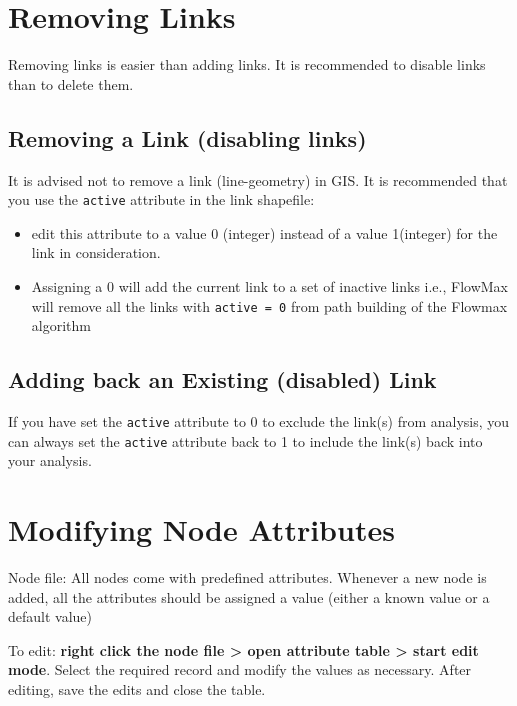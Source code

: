 \documentclass[
]{book}
\begin{document}
\chapter{Removing Links}\label{removing-links}

Removing links is easier than adding links. It is recommended to disable links than to delete them.

\section{Removing a Link (disabling links)}\label{removing-a-link-disabling-links}

It is advised not to remove a link (line-geometry) in GIS. It is recommended that you use the \texttt{active} attribute in the link shapefile:

\begin{itemize}
\item
  edit this attribute to a value 0 (integer) instead of a value 1(integer) for the link in consideration.
\item
  Assigning a 0 will add the current link to a set of inactive links i.e., FlowMax will remove all the links with \texttt{active\ =\ 0} from path building of the Flowmax algorithm
\end{itemize}

\section{Adding back an Existing (disabled) Link}\label{adding-back-an-existing-disabled-link}

If you have set the \texttt{active} attribute to 0 to exclude the link(s) from analysis, you can always set the \texttt{active} attribute back to 1 to include the link(s) back into your analysis.

\chapter{Modifying Node Attributes}\label{modifying-node-attributes}

Node file: All nodes come with predefined attributes. Whenever a new node is added, all the attributes should be assigned a value (either a known value or a default value)

To edit: \textbf{right click the node file \textgreater{} open attribute table \textgreater{} start edit mode}. Select the required record and modify the values as necessary. After editing, save the edits and close the table.
\end{document}
